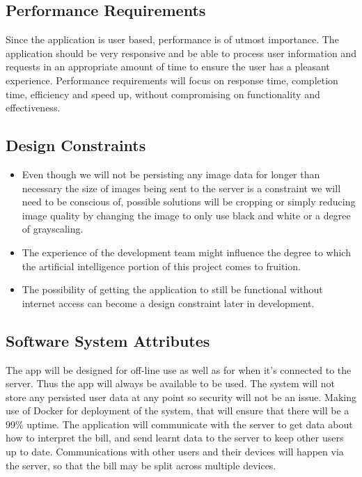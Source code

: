 \documentclass[12pt,a4paper]{article}
\begin{document}
	\subsection{Performance Requirements}
		Since the application is user based, performance is of utmost importance. The application should be very responsive and be able to process user information and requests in an appropriate amount of time to ensure the user has a pleasant experience. Performance requirements will focus on response time, completion time, efficiency and speed up, without compromising on functionality and effectiveness. 
	\subsection{Design Constraints}

		\begin{itemize}
			\item Even though we will not be persisting any image data for longer than necessary the size of images being sent to the server is a constraint we will need to be conscious of, possible solutions will be cropping or simply reducing image quality by changing the image to only use black and white or a degree of grayscaling.
			\item The experience of the development team might influence the degree to which the artificial intelligence portion of this project comes to fruition.
			\item The possibility of getting the application to still be functional without internet access can become a design constraint later in development.
		\end{itemize}

	\subsection{Software System Attributes}
   		The app will be designed for off-line use as well as for when it's connected to the server. Thus the app will always be available to be used. The system will not store any persisted user data at any point so security will not be an issue. Making use of Docker for  deployment of the system, that will ensure that there will be a 99\% uptime. The application will communicate with the server to get data about how to interpret the bill, and send learnt data to the server to keep other users up to date. Communications with other users and their devices will happen via the server, so that the bill may be split across multiple devices.
\end{document}
